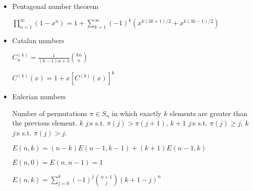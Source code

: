 \begin{itemize}
$S(n, k) = S(n - 1, k - 1) + kS(n - 1, k), S(n, 1) = S(n, n) = 1$

$S(n, k) = \frac{1}{k!}\sum_{i=0}^{k}(-1)^{k-i}{k \choose i}i^n$

$x^n     = \sum_{i=0}^{n} S(n, i) (x)_i$

\item Pentagonal number theorem

$\displaystyle\prod_{n=1}^{\infty}(1-x^n)=1+\sum_{k=1}^{\infty}(-1)^k\left(x^{k(3k+1)/2} + x^{k(3k-1)/2}\right)$

\item Catalan numbers

$C^{(k)}_n = \displaystyle \frac{1}{(k - 1)n + 1}\binom{kn}{n}$

$C^{(k)}(x) = 1 + x [C^{(k)}(x)]^k$

\item Eulerian numbers

Number of permutations $\pi \in S_n$ in which exactly $k$ elements are greater than the previous element. $k$ $j$:s s.t. $\pi(j)>\pi(j+1)$, $k+1$ $j$:s s.t. $\pi(j)\geq j$, $k$ $j$:s s.t. $\pi(j)>j$.

$E(n,k) = (n-k)E(n-1,k-1) + (k+1)E(n-1,k)$

$E(n,0) = E(n,n-1) = 1$

$E(n,k) = \sum_{j=0}^k(-1)^j\binom{n+1}{j}(k+1-j)^n$

\end{itemize}
